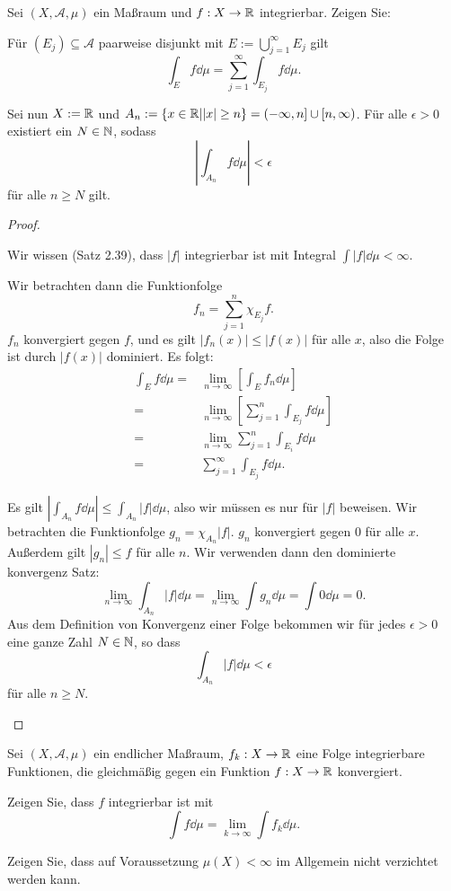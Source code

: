 \begin{Problem}
	Sei $(X,\mathcal{A},\mu)$ ein Maßraum und $f:X\to \mathbb{R}$ integrierbar. Zeigen Sie:
	\begin{parts}
		\item F\"{u}r $(E_j)\subseteq \mathcal{A}$ paarweise disjunkt mit $E:=\bigcup_{j=1}^\infty E_j$ gilt
			\[
				\int_E f\dd{\mu}=\sum_{j=1}^\infty \int_{E_j} f\dd{\mu}
			.\] 
		\item Sei nun $X:=\mathbb{R}$ und $A_n:=\left\{ x\in \mathbb{R}| |x|\ge n \right\} =(-\infty,n] \cup [n,\infty)$. F\"{u}r alle $\epsilon>0$ existiert ein $N\in \mathbb{N}$, sodass
			\[
				\left| \int_{A_n}f\dd{\mu} \right| <\epsilon
			\]
			f\"{u}r alle $n\ge N$ gilt.
	\end{parts}
\end{Problem}
\begin{proof}
	\begin{parts}
	\item Wir wissen (Satz 2.39), dass $|f|$ integrierbar ist mit Integral $\int |f|\dd{\mu}<\infty$. 

		Wir betrachten dann die Funktionfolge
		\[
			f_n=\sum_{j=1}^n \chi_{E_j}f
		.\] 
		$f_n$ konvergiert gegen $f$, und es gilt $|f_n(x)|\le |f(x)|$ f\"{u}r alle $x$, also die Folge ist durch $|f(x)|$ dominiert. Es folgt:
		\begin{align*}
			\int_E f\dd{\mu}=&\lim_{n \to \infty} \left[ \int_E f_n \dd{\mu} \right] \\
			=& \lim_{n \to \infty}\left[ \sum_{j=1}^n \int_{E_j}f\dd{\mu} \right] \\
			=&\lim_{n \to \infty} \sum_{j=1}^n\int_{E_i} f\dd{\mu}\\
			=&\sum_{j=1}^\infty \int_{E_j}f\dd{\mu}.
		\end{align*}
	\item Es gilt $\left| \int_{A_n}f\dd{\mu} \right| \le \int_{A_n}|f|\dd{\mu}$, also wir müssen es nur f\"{u}r $|f|$ beweisen. Wir betrachten die Funktionfolge $g_n=\chi_{A_n}|f|$. $g_n$ konvergiert gegen $0$ f\"{u}r alle $x$. Außerdem gilt $|g_n|\le f$ f\"{u}r alle $n$. Wir verwenden dann den dominierte konvergenz Satz:
		\[
			\lim_{n \to \infty} \int_{A_n}|f|\dd{\mu}=\lim_{n \to \infty} \int g_n\dd{\mu}=\int 0\dd{\mu}=0
		.\]
		Aus dem Definition von Konvergenz einer Folge bekommen wir f\"{u}r jedes $\epsilon>0$ eine ganze Zahl $N\in \mathbb{N}$, so dass
		\[
			\int_{A_n}|f|\dd{\mu}<\epsilon
		\]
		f\"{u}r alle $n\ge N$.
	\end{parts}
\end{proof}
\begin{Problem}
	Sei $(X,\mathcal{A},\mu)$ ein endlicher Maßraum, $f_k:X\to \mathbb{R}$ eine Folge integrierbare Funktionen, die gleichmäßig gegen ein Funktion $f:X\to \mathbb{R}$ konvergiert.
	\begin{parts}
	\item Zeigen Sie, dass $f$ integrierbar ist mit
		\[
			\int f\dd{\mu}=\lim_{k \to \infty} \int f_k\dd{\mu}
		.\] 
	\item Zeigen Sie, dass auf Voraussetzung $\mu(X)<\infty$ im Allgemein nicht verzichtet werden kann.
	\end{parts}
\end{Problem}
